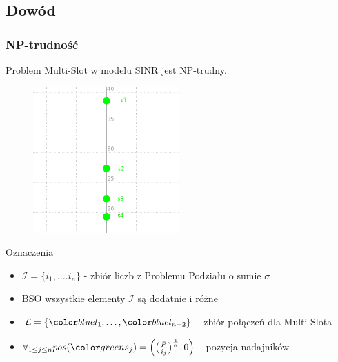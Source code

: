 \documentclass[polish, t,10pt]{beamer}
\begin{document}
\subsection{Dowód}
\begin{frame}
    \frametitle{NP-trudność}
    \begin{theorem}
        Problem Multi-Slot w modelu SINR jest NP-trudny.
    \end{theorem}
    \begin{figure}
        \includegraphics[width=0.5\textwidth]{pictures/np-placement1.png}
    \end{figure}
    \begin{block}{Oznaczenia}
        \begin{itemize}
            \item $\mathcal{I} = \{i_1, \ldots. i_n\}$ - zbiór liczb z Problemu Podziału o sumie $\sigma$
            \item BSO wszystkie elementy $\mathcal{I}$ są dodatnie i różne
            \item $\mathcal{L} = \{\lo, \ldots, \lnt\}$ - zbiór połączeń dla Multi-Slota
            \item $\forall_{1 \leq j \leq n} pos(\sj) = \Big(\big(\frac{P}{i_j}\big)^\frac{1}{\alpha}, 0\Big)$ - pozycja nadajników
        \end{itemize}
    \end{block}
\end{frame}
\end{document}

